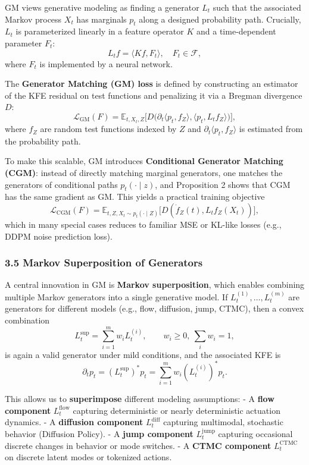 \documentclass[
]{article}
\theoremstyle{remark}
\begin{document}
GM views generative modeling as finding a generator \(L_t\) such that
the associated Markov process \(X_t\) has marginals \(p_t\) along a
designed probability path. Crucially, \(L_t\) is parameterized linearly
in a feature operator \(K\) and a time-dependent parameter
\(F_t\): \cite{gm2025} \[
L_t f = \langle K f, F_t \rangle, \quad F_t \in \mathcal{F},
\] where \(F_t\) is implemented by a neural network. \cite{gm2025}

The \textbf{Generator Matching (GM) loss} is defined by constructing an
estimator of the KFE residual on test functions and penalizing it via a
Bregman divergence \(D\): \[
\mathcal{L}_{\text{GM}}(F) = \mathbb{E}_{t, X_t, Z}\bigl[D\bigl( \partial_t \langle p_t, f_Z \rangle, \langle p_t, L_t f_Z \rangle\bigr)\bigr],
\] where \(f_Z\) are random test functions indexed by \(Z\) and
\(\partial_t \langle p_t, f_Z \rangle\) is estimated from the
probability path. \cite{gm2025}

To make this scalable, GM introduces \textbf{Conditional Generator
Matching (CGM)}: instead of directly matching marginal generators, one
matches the generators of conditional paths \(p_t(\cdot\mid z)\), and
Proposition 2 shows that CGM has the same gradient as GM. This yields a
practical training objective \cite{gm-companion-notes,gm2025} \[
\mathcal{L}_{\text{CGM}}(F) = \mathbb{E}_{t, Z, X_t \sim p_t(\cdot\mid Z)} \bigl[D(\dot f_Z(t), L_t f_Z(X_t))\bigr],
\] which in many special cases reduces to familiar MSE or KL-like losses
(e.g., DDPM noise prediction loss). \cite{diffpolicy-theory-notes,gm2025}

\subsubsection{3.5 Markov Superposition of
Generators}\label{markov-superposition-of-generators}

A central innovation in GM is \textbf{Markov superposition}, which
enables combining multiple Markov generators into a single generative
model. If \(L_t^{(1)}, \dots, L_t^{(m)}\) are generators for different
models (e.g., flow, diffusion, jump, CTMC), then a convex
combination \cite{gm2025} \[
L_t^{\text{sup}} = \sum_{i=1}^m w_i L_t^{(i)}, \qquad w_i \ge 0, \ \sum_i w_i = 1,
\] is again a valid generator under mild conditions, and the associated
KFE is \[
\partial_t p_t = (L_t^{\text{sup}})^* p_t = \sum_{i=1}^m w_i (L_t^{(i)})^* p_t.
\]

This allows us to \textbf{superimpose} different modeling assumptions: -
A \textbf{flow component} \(L_t^{\text{flow}}\) capturing deterministic
or nearly deterministic actuation dynamics. - A \textbf{diffusion
component} \(L_t^{\text{diff}}\) capturing multimodal, stochastic
behavior (Diffusion Policy). - A \textbf{jump component}
\(L_t^{\text{jump}}\) capturing occasional discrete changes in behavior
or mode switches. - A \textbf{CTMC component} \(L_t^{\text{CTMC}}\) on
discrete latent modes or tokenized actions. \cite{gm2025}
\end{document}
